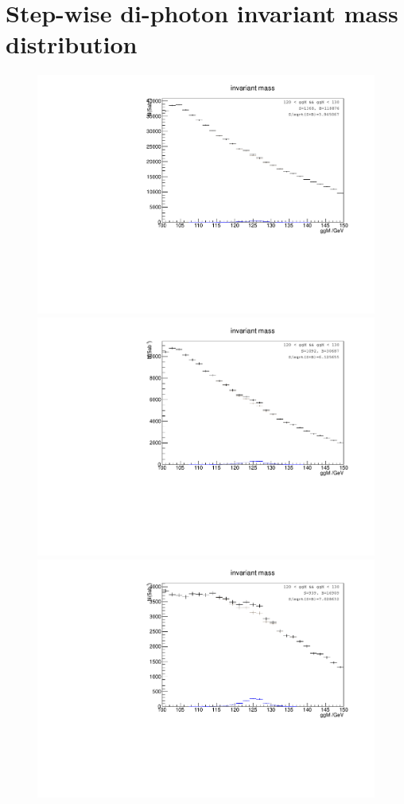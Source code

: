 \documentclass[11pt,a4paper]{cepcnote}
\begin{document}
\section{Step-wise di-photon invariant mass distribution}
\begin{figure}[h]
	\includegraphics[scale=0.4,clip]{ggM_IIIXgd1.pdf}
	\includegraphics[scale=0.4,clip]{ggM_IIIXgd2.pdf}
	\includegraphics[scale=0.4,clip]{ggM_IIIXgd3.pdf}

\end{figure}
\end{document}
